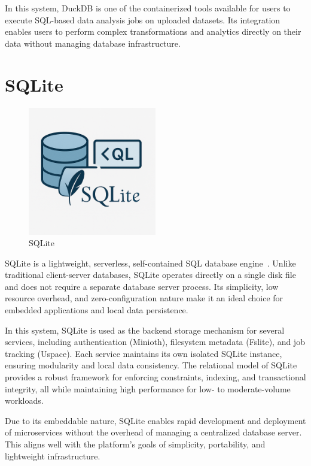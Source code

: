 In this system, DuckDB is one of the containerized tools available for users to execute SQL-based data analysis jobs on uploaded datasets. 
Its integration enables users to perform complex transformations and analytics directly on their data without managing database 
infrastructure.

\section{SQLite}

\begin{figure}[h!]
  \centering
  \includegraphics[width=0.5\textwidth]{Images/sqlite-chatgpt-img.png}
  \caption{SQLite}
  \label{fig:sqlite}
\end{figure}

SQLite is a lightweight, serverless, self-contained SQL database engine~\cite{sqlite-docs}. Unlike traditional client-server databases, 
SQLite operates directly on a single disk file and does not require a separate database server process. Its simplicity, low resource 
overhead, and zero-configuration nature make it an ideal choice for embedded applications and local data persistence.

In this system, SQLite is used as the backend storage mechanism for several services, including authentication (Minioth), 
filesystem metadata (Fslite), and job tracking (Uspace). Each service maintains its own isolated SQLite instance, ensuring 
modularity and local data consistency. The relational model of SQLite provides a robust framework for enforcing constraints, 
indexing, and transactional integrity, all while maintaining high performance for low- to moderate-volume workloads.

Due to its embeddable nature, SQLite enables rapid development and deployment of microservices without the overhead of managing 
a centralized database server. This aligns well with the platform’s goals of simplicity, portability, and lightweight infrastructure.


